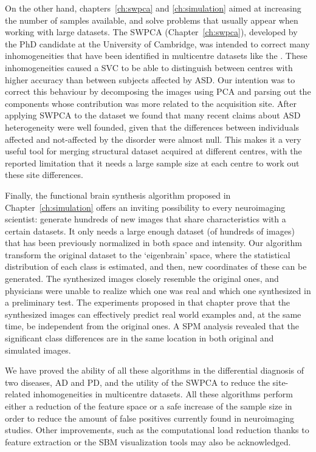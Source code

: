 On the other hand, chapters~\ref{ch:swpca} and \ref{ch:simulation} aimed at increasing the number of samples available, and solve problems that usually appear when working with large datasets. The \ac{SWPCA} (Chapter~\ref{ch:swpca}), developed by the PhD candidate at the University of Cambridge, was intended to correct many inhomogeneities that have been identified in multicentre datasets like the \aimsmri{}. These inhomogeneities caused a \ac{SVC} to be able to distinguish between centres with higher accuracy than between subjects affected by \ac{ASD}. Our intention was to correct this behaviour by decomposing the images using \ac{PCA} and parsing out the components whose contribution was more related to the acquisition site. After applying \ac{SWPCA} to the dataset we found that many recent claims about \ac{ASD} heterogeneity \cite{haar2014anatomical} were well founded, given that the differences between individuals affected and not-affected by the disorder were almost null. This makes it a very useful tool for merging structural dataset acquired at different centres, with the reported limitation that it needs a large sample size at each centre to work out these site differences. 

Finally, the functional brain synthesis algorithm proposed in Chapter~\ref{ch:simulation} offers an inviting possibility to every neuroimaging scientist: generate hundreds of new images that share characteristics with a certain datasets. It only needs a large enough dataset (of hundreds of images) that has been previously normalized in both space and intensity. Our algorithm transform the original dataset to the `eigenbrain' space, where the statistical distribution of each class is estimated, and then, new coordinates of these can be generated. The synthesized images closely resemble the original ones, and physicians were unable to realize which one was real and which one synthesized in a preliminary test. The experiments proposed in that chapter prove that the synthesized images can effectively predict real world examples and, at the same time, be independent from the original ones. A \ac{SPM} analysis revealed that the significant class differences are in the same location in both original and simulated images. 

We have proved the ability of all these algorithms in the differential diagnosis of two diseases, \ac{AD} and \ac{PD}, and the utility of the \ac{SWPCA} to reduce the site-related inhomogeneities in multicentre datasets. All these algorithms perform either a reduction of the feature space or a safe increase of the sample size in order to reduce the amount of false positives currently found in neuroimaging studies. Other improvements, such as the computational load reduction thanks to feature extraction or the \ac{SBM} visualization tools may also be acknowledged. 


